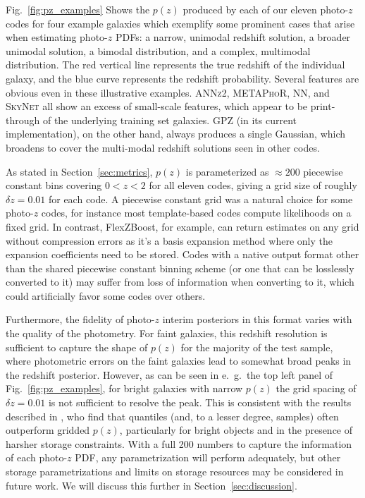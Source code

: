 \documentclass[usenatbib]{mn2e}
\newcommand{\red}[1]{\textcolor{red}{#1}}
\begin{document}
Fig.~\ref{fig:pz_examples} Shows the $p(z)$ produced by each of our eleven photo-$z$ codes for four example galaxies which exemplify some prominent cases that arise when estimating photo-$z$ PDFs: a narrow, unimodal redshift solution, a broader unimodal solution, a bimodal distribution, and a complex, multimodal distribution.   
The red vertical line represents the true redshift of the individual galaxy, and the blue curve represents the redshift probability.  
Several features are obvious even in these illustrative examples.  
\textsc{ANNz2, METAPhoR, NN,} and \textsc{SkyNet} all show an excess of small-scale features, which appear to be print-through of the underlying training set galaxies.  
\textsc{GPZ} (in its current implementation), on the other hand, always produces a single Gaussian, which broadens to cover the multi-modal redshift solutions seen in other codes.

As stated in Section~\ref{sec:metrics}, $p(z)$ is parameterized as $\approx 200$ piecewise constant bins covering $0<z<2$ for all eleven codes, giving a grid size of roughly $\delta z = 0.01$ for each code.  
A piecewise constant grid was a natural choice for some photo-$z$ codes, for instance most template-based codes compute likelihoods on a fixed grid.  
In contrast, FlexZBoost, for example, can return estimates on any grid without compression errors as it’s a basis expansion method where only the expansion coefficients need to be stored.
Codes with a native output format other than the shared piecewise constant binning scheme (or one that can be losslessly converted to it) may suffer from loss of information when converting to it, which could artificially favor some codes over others.

Furthermore, the fidelity of photo-$z$ interim posteriors in this format varies with the quality of the photometry.  
For faint galaxies, this redshift resolution is sufficient to capture the shape of $p(z)$ for the majority of the test sample, where photometric errors on the faint galaxies lead to somewhat broad peaks in the redshift posterior.  
However, as can be seen in e.~g.~the top left panel of Fig.~\ref{fig:pz_examples}, for bright galaxies with narrow $p(z)$ the grid spacing of $\delta z = 0.01$ is not sufficient to resolve the peak.  
This is consistent with the results described in \citet[]{Malz:qp}, who find that quantiles (and, to a lesser degree, samples) often outperform gridded $p(z)$, particularly for bright objects and in the presence of harsher storage constraints.  
With a full 200 numbers to capture the information of each photo-$z$ PDF, any parametrization will perform adequately, but other storage parametrizations and limits on storage resources may be considered in future work.  
We will discuss this further in Section~\ref{sec:discussion}.
\end{document}
